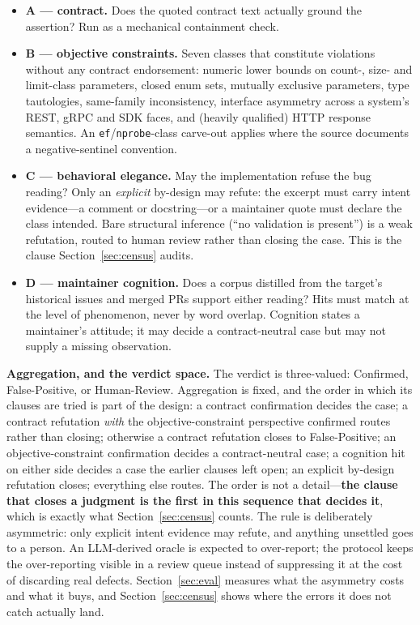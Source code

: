 \documentclass[acmsmall,screen,review,anonymous]{acmart}
\begin{document}
\begin{itemize}
  \item \textbf{A --- contract.} Does the quoted contract text actually ground the assertion? Run as
    a mechanical containment check.
  \item \textbf{B --- objective constraints.} Seven classes that constitute violations without any
    contract endorsement: numeric lower bounds on count-, size- and limit-class parameters, closed
    enum sets, mutually exclusive parameters, type tautologies, same-family inconsistency, interface
    asymmetry across a system's REST, gRPC and SDK faces, and (heavily qualified) HTTP response
    semantics. An \texttt{ef}/\texttt{nprobe}-class carve-out applies where the source documents a
    negative-sentinel convention.
  \item \textbf{C --- behavioral elegance.} May the implementation refuse the bug reading? Only an
    \emph{explicit} by-design may refute: the excerpt must carry intent evidence---a comment or
    docstring---or a maintainer quote must declare the class intended. Bare structural inference
    (``no validation is present'') is a weak refutation, routed to human review rather than closing
    the case. This is the clause Section~\ref{sec:census} audits.
  \item \textbf{D --- maintainer cognition.} Does a corpus distilled from the target's historical
    issues and merged PRs support either reading? Hits must match at the level of phenomenon, never
    by word overlap. Cognition states a maintainer's attitude; it may decide a contract-neutral case
    but may not supply a missing observation.
\end{itemize}

\textbf{Aggregation, and the verdict space.} The verdict is three-valued: Confirmed,
False-Positive, or Human-Review. Aggregation is fixed, and the order in which its clauses are tried
is part of the design: a contract confirmation decides the case; a contract refutation \emph{with}
the objective-constraint perspective confirmed routes rather than closing; otherwise a contract
refutation closes to False-Positive; an objective-constraint confirmation decides a
contract-neutral case; a cognition hit on either side decides a case the earlier clauses left open;
an explicit by-design refutation closes; everything else routes. The order is not a
detail---\textbf{the clause that closes a judgment is the first in this sequence that decides
it}, which is exactly what Section~\ref{sec:census} counts. The rule is deliberately
asymmetric: only explicit intent evidence may refute, and anything unsettled goes to a person. An
LLM-derived oracle is expected to over-report; the protocol keeps the over-reporting
visible in a review queue instead of suppressing it at the cost of discarding real defects.
Section~\ref{sec:eval} measures what the asymmetry costs and what it buys, and
Section~\ref{sec:census} shows where the errors it does not catch actually land.
\end{document}
